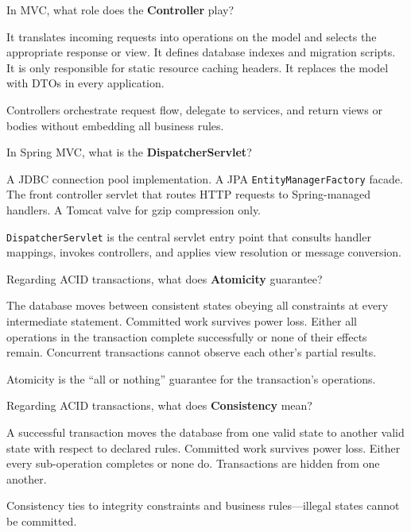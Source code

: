 \question[4]
In MVC, what role does the \textbf{Controller} play?
\begin{choices}
  \CorrectChoice It translates incoming requests into operations on the model and selects the appropriate response or view.
  \choice It defines database indexes and migration scripts.
  \choice It is only responsible for static resource caching headers.
  \choice It replaces the model with DTOs in every application.
\end{choices}
\begin{solution}
  Controllers orchestrate request flow, delegate to services, and return views or bodies without embedding all business rules.
\end{solution}

\question[4]
In Spring MVC, what is the \textbf{DispatcherServlet}?
\begin{choices}
  \choice A JDBC connection pool implementation.
  \choice A JPA \texttt{EntityManagerFactory} facade.
  \CorrectChoice The front controller servlet that routes HTTP requests to Spring-managed handlers.
  \choice A Tomcat valve for gzip compression only.
\end{choices}
\begin{solution}
  \texttt{DispatcherServlet} is the central servlet entry point that consults handler mappings, invokes controllers, and applies view resolution or message conversion.
\end{solution}

\question[4]
Regarding ACID transactions, what does \textbf{Atomicity} guarantee?
\begin{choices}
  \choice The database moves between consistent states obeying all constraints at every intermediate statement.
  \choice Committed work survives power loss.
  \CorrectChoice Either all operations in the transaction complete successfully or none of their effects remain.
  \choice Concurrent transactions cannot observe each other's partial results.
\end{choices}
\begin{solution}
  Atomicity is the ``all or nothing'' guarantee for the transaction's operations.
\end{solution}

\question[4]
Regarding ACID transactions, what does \textbf{Consistency} mean?
\begin{choices}
  \CorrectChoice A successful transaction moves the database from one valid state to another valid state with respect to declared rules.
  \choice Committed work survives power loss.
  \choice Either every sub-operation completes or none do.
  \choice Transactions are hidden from one another.
\end{choices}
\begin{solution}
  Consistency ties to integrity constraints and business rules---illegal states cannot be committed.
\end{solution}


